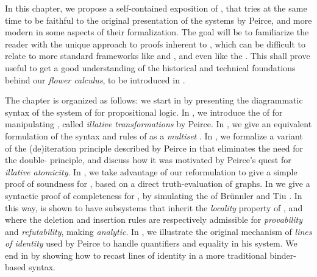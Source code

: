 In this chapter, we propose a self-contained exposition of , that tries
at the same time to be faithful to the original presentation of the systems by
Peirce, and more modern in some aspects of their formalization. The goal will be
to familiarize the reader with the unique approach to proofs inherent to
, which can be difficult to relate to more standard frameworks like
 and  , and
even   like the .
This shall prove useful to get a good understanding of the historical and
technical foundations behind our \emph{flower calculus}, to be introduced in
.

The chapter is organized as follows: we start in  by presenting
the diagrammatic syntax of the system  of  for 
propositional logic. In , we introduce the  of
 for manipulating , called \emph{illative
transformations} by Peirce. In , we give an equivalent
formulation of the syntax and rules of  as a \emph{multiset} . In , we formalize a variant of the (de)iteration
principle described by Peirce in  that
eliminates the need for the double- principle, and discuss how it was
motivated by Peirce's quest for \emph{illative atomicity}. In
, we take advantage of our reformulation to give a simple
proof of soundness for , based on a direct truth-evaluation of graphs.
In  we give a syntactic proof of completeness for
, by simulating the   of Brünnler and
Tiu . In this way,  is shown to have
subsystems that inherit the \emph{locality} property of , and where the
deletion and insertion rules are respectively admissible for \emph{provability}
and \emph{refutability}, making  \emph{analytic}. In , we
illustrate the original mechanism of \emph{lines of identity} used by Peirce to
handle quantifiers and equality in his  system. We end in
 by showing how to recast lines of identity in a more
traditional binder-based syntax.



